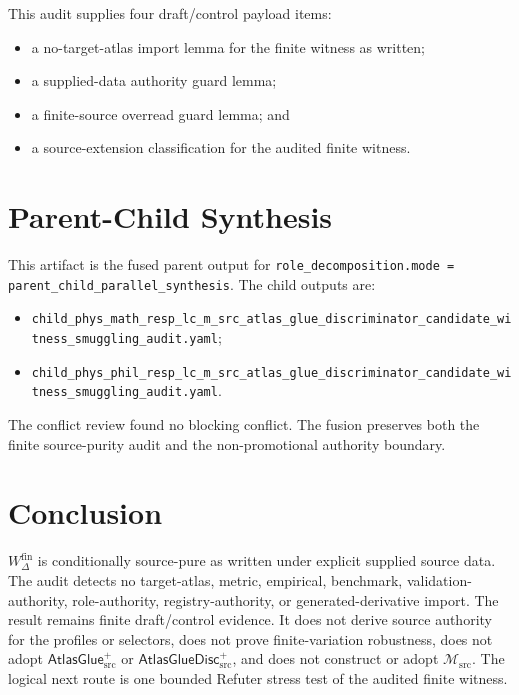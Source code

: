 \documentclass[11pt]{article}
\newcommand{\Msrc}{\mathcal{M}_{\mathrm{src}}}
\newcommand{\AtlasGlue}{\mathsf{AtlasGlue}_{\mathrm{src}}^{+}}
\newcommand{\AtlasGlueDisc}{\mathsf{AtlasGlueDisc}_{\mathrm{src}}^{+}}
\newcommand{\Wfin}{W_{\Delta}^{\mathrm{fin}}}
\begin{document}
This audit supplies four draft/control payload items:
\begin{itemize}
  \item a no-target-atlas import lemma for the finite witness as written;
  \item a supplied-data authority guard lemma;
  \item a finite-source overread guard lemma; and
  \item a source-extension classification for the audited finite witness.
\end{itemize}

\section{Parent-Child Synthesis}

This artifact is the fused parent output for
\texttt{role\_decomposition.mode = parent\_child\_parallel\_synthesis}. The
child outputs are:
\begin{itemize}
  \item \texttt{child\_phys\_math\_resp\_lc\_m\_src\_atlas\_glue\_discriminator\_candidate\_witness\_smuggling\_audit.yaml};
  \item \texttt{child\_phys\_phil\_resp\_lc\_m\_src\_atlas\_glue\_discriminator\_candidate\_witness\_smuggling\_audit.yaml}.
\end{itemize}
The conflict review found no blocking conflict. The fusion preserves both the
finite source-purity audit and the non-promotional authority boundary.

\section{Conclusion}

\(\Wfin\) is conditionally source-pure as written under explicit supplied
source data. The audit detects no target-atlas, metric, empirical, benchmark,
validation-authority, role-authority, registry-authority, or
generated-derivative import. The result remains finite draft/control evidence.
It does not derive source authority for the profiles or selectors, does not
prove finite-variation robustness, does not adopt \(\AtlasGlue\) or
\(\AtlasGlueDisc\), and does not construct or adopt \(\Msrc\). The logical next
route is one bounded Refuter stress test of the audited finite witness.
\end{document}
